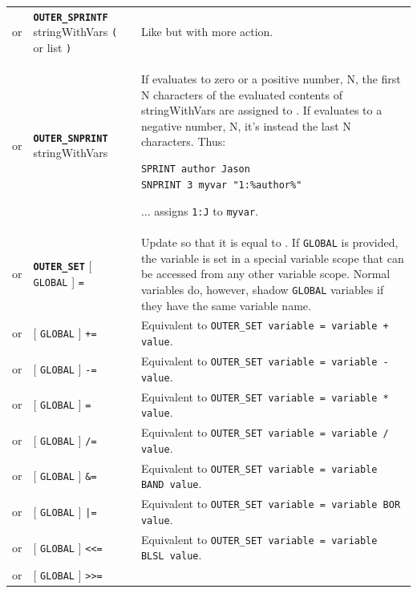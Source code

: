 \documentclass{article}
\def\ttref#1{\ahrefloc{#1}{\tt #1}}
\def\DEFINE#1{{\tt \bf #1}\label{#1}\index{#1}}
\def\t#1{{\tt #1}}
\def\Slist{{\color{red} list }}
\def\Ob{{\color{red} [ }}
\def\Oe{{\color{red} ] }}
\begin{document}
\begin{tabular}{cp{10in}|p{10in}}
or & \DEFINE{OUTER_SPRINTF} \ttref{variable} stringWithVars \t{(}
\ttref{variable} or \ttref{value} \Slist \t{)} &
  Like \ttref{SPRINTF} but with more action. \\

or & \DEFINE{OUTER_SNPRINT} \ttref{value} \ttref{variable} stringWithVars &
  If \ttref{value} evaluates to zero or a positive number, N, the first
  N characters of the evaluated contents of stringWithVars are
  assigned to \ttref{variable}. If \ttref{value} evaluates to a
  negative number, N, it's instead the last N characters. Thus:
\begin{verbatim}
SPRINT author Jason
SNPRINT 3 myvar "1:%author%"
\end{verbatim}
  ... assigns \t{1:J} to \t{myvar}.  \\
or & \DEFINE{OUTER_SET} \Ob \t{GLOBAL} \Oe \ttref{variable} \t{=} \ttref{value} &
  Update \ttref{variable} so that it is equal to \ttref{value}. If
  \t{GLOBAL} is provided, the variable is set in a special variable
  scope that can be accessed from any other variable scope. Normal
  variables do, however, shadow \t{GLOBAL} variables if they have the
  same variable name. \\
or & \ttref{OUTER_SET} \Ob \t{GLOBAL} \Oe \ttref{variable} \t{+=} \ttref{value} &
  Equivalent to \t{OUTER_SET variable = variable + value}. \\
or & \ttref{OUTER_SET} \Ob \t{GLOBAL} \Oe \ttref{variable} \t{-=} \ttref{value} &
  Equivalent to \t{OUTER_SET variable = variable - value}. \\
or & \ttref{OUTER_SET} \Ob \t{GLOBAL} \Oe \ttref{variable} \t{*=} \ttref{value} &
  Equivalent to \t{OUTER_SET variable = variable * value}. \\
or & \ttref{OUTER_SET} \Ob \t{GLOBAL} \Oe \ttref{variable} \t{/=} \ttref{value} &
  Equivalent to \t{OUTER_SET variable = variable / value}. \\
or & \ttref{OUTER_SET} \Ob \t{GLOBAL} \Oe \ttref{variable} \t{\&=} \ttref{value} &
  Equivalent to \t{OUTER_SET variable = variable BAND value}. \\
or & \ttref{OUTER_SET} \Ob \t{GLOBAL} \Oe \ttref{variable} \t{|=} \ttref{value} &
  Equivalent to \t{OUTER_SET variable = variable BOR value}. \\
or & \ttref{OUTER_SET} \Ob \t{GLOBAL} \Oe \ttref{variable} \t{<<=} \ttref{value} &
  Equivalent to \t{OUTER_SET variable = variable BLSL value}. \\
or & \ttref{OUTER_SET} \Ob \t{GLOBAL} \Oe \ttref{variable} \t{>>=} \ttref{value} &

\end{tabular}
\end{document}
